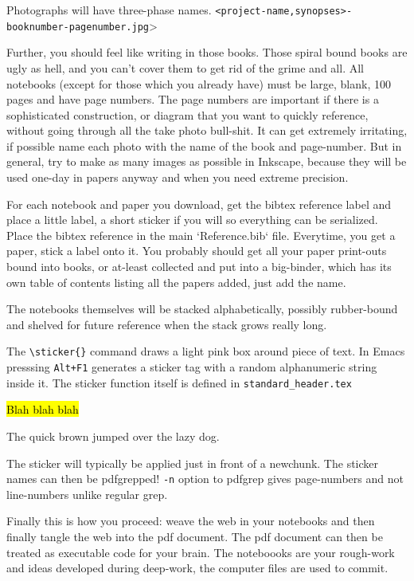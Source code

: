 \begin{appendices}
Photographs will have three-phase names. \verb|<project-name,synopses>-booknumber-pagenumber.jpg|>

Further, you should feel like writing in those books. Those spiral
bound books are ugly as hell, and you can't cover them to get rid of the 
grime and all. 
All notebooks (except for those which you already have) must be large, 
blank, 100 pages and have page numbers. The page numbers are important 
if there is a sophisticated construction, or diagram that you want to 
quickly reference, without going through all the take photo bull-shit. 
It can get extremely irritating, if possible name each photo with the 
name of the book and page-number. But in general, try to make as many 
images as possible in Inkscape, because they will be used one-day in 
papers anyway and when you need extreme precision.
	      
For each notebook and paper you download, get the bibtex reference label 
and place a little label, a short sticker if you will so everything can be 
serialized. Place the bibtex reference in the main `Reference.bib` file. 
Everytime, you get a paper, stick a label onto it. You probably should get 
all your paper print-outs bound into books, or at-least collected and put 
into a big-binder, which has its own table of contents listing all the 
papers added, just add the name. 

The notebooks themselves will be stacked alphabetically, possibly
rubber-bound and shelved for future reference when the stack grows really long. 

The \verb|\sticker{}| command draws a light pink box around piece of text. In
Emacs presssing \verb|Alt+F1| generates a sticker tag with a random alphanumeric
string inside it. The sticker function itself is defined in \verb|standard_header.tex|

\hl{Blah blah blah}


\begin{center}
{\large The quick brown  jumped over the lazy dog. }
\end{center}

The sticker will typically be applied just in front of a newchunk. The sticker names
can then be pdfgrepped! \verb|-n| option to pdfgrep gives page-numbers and not
line-numbers unlike regular grep. 

Finally this is how you proceed: weave the web in your notebooks and then finally
tangle the web into the pdf document. The pdf document can then be treated as
executable code for your brain. The noteboooks are your rough-work and ideas
developed during deep-work, the computer files are used to commit. 



\end{appendices}
